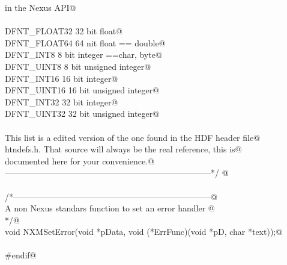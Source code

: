 \documentclass[12pt]{article}
\begin{document}
\begin{flushleft}
\begin{minipage}{\linewidth}
\begin{list}{}{}
\mbox{}\verb@                       in the Nexus API@\\
\mbox{}\verb@@\\
\mbox{}\verb@  DFNT_FLOAT32     32 bit float@\\
\mbox{}\verb@  DFNT_FLOAT64     64 nit float == double@\\
\mbox{}\verb@  DFNT_INT8        8 bit integer ==char, byte@\\
\mbox{}\verb@  DFNT_UINT8       8 bit unsigned integer@\\
\mbox{}\verb@  DFNT_INT16       16 bit integer@\\
\mbox{}\verb@  DFNT_UINT16      16 bit unsigned integer@\\
\mbox{}\verb@  DFNT_INT32       32 bit integer@\\
\mbox{}\verb@  DFNT_UINT32      32 bit unsigned integer@\\
\mbox{}\verb@@\\
\mbox{}\verb@  This list is a edited version of the one found in the HDF header file@\\
\mbox{}\verb@  htndefs.h. That source will always be the real reference, this is@\\
\mbox{}\verb@  documented here for your convenience.@\\
\mbox{}\verb@--------------------------------------------------------------------------*/ @\\
\mbox{}\verb@@\\
\mbox{}\verb@/*-----------------------------------------------------------------------@\\
\mbox{}\verb@    A non Nexus standars function to set an error handler @\\
\mbox{}\verb@*/@\\
\mbox{}\verb@  void NXMSetError(void *pData, void (*ErrFunc)(void *pD, char *text));@\\
\mbox{}\verb@@\\
\mbox{}\verb@#endif@\\
\mbox{}\verb@@\\
\end{list}
\vspace{-2ex}
\end{minipage}\\[4ex]
\end{flushleft}
\end{document}
